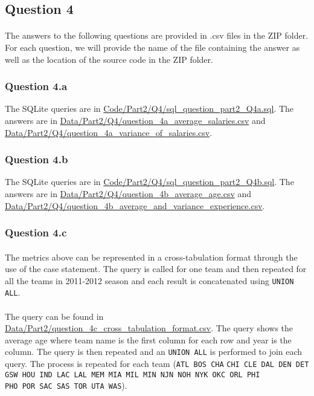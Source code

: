 
\subsection{Question 4}
\label{subsec:414}

\paragraph{}The answers to the following questions are provided in .csv files in the ZIP folder. For each question, we will provide the name of the file containing the answer as well as the location of the source code in the ZIP folder.

\subsubsection{Question 4.a}
\label{subsubsec:414a}

\paragrapg{}The SQLite queries are in \url{Code/Part2/Q4/sql_question_part2_Q4a.sql}. The answers are in \url{Data/Part2/Q4/question_4a_average_salaries.csv} and \url{Data/Part2/Q4/question_4a_variance_of_salaries.csv}.

\subsubsection{Question 4.b}
\label{subsubsec:414b}

\paragrapg{}The SQLite queries are in \url{Code/Part2/Q4/sql_question_part2_Q4b.sql}. The answers are in \url{Data/Part2/Q4/question_4b_average_age.csv} and \url{Data/Part2/Q4/question_4b_average_and_variance_experience.csv}.

\subsubsection{Question 4.c}
\label{subsubsec:414c}

\paragraph{}The metrics above can be represented in a cross-tabulation format through the use of the case statement. The query is called for one team and then repeated for all the teams in 2011-2012 season and each result is concatenated using \verb|UNION ALL|. 

\paragraph{}The query can be found in \url{Data/Part2/question_4c_cross_tabulation_format.csv}.
The query shows the average age where team name is the first column for each row and year is the column. The query is then repeated and an \verb|UNION ALL| is performed to join each query. The process is repeated for each team (\verb|ATL BOS CHA| \verb|CHI CLE DAL DEN DET GSW HOU IND LAC LAL MEM MIA MIL MIN NJN NOH NYK OKC ORL PHI| \\ \verb|PHO POR SAC SAS TOR UTA WAS|).

